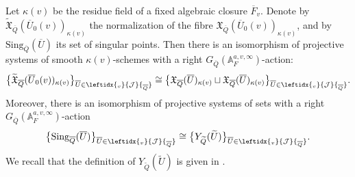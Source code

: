 \documentclass[a4paper, notitlepage, 10pt]{amsart}
\theoremstyle{plain} %
\theoremstyle{definition} %
\theoremstyle{remark} %
\numberwithin{equation}{section}
\begin{document}
 Let $\kappa(v)$ be the residue field of a fixed algebraic closure $\overline{F}_v$. Denote by ${\widetilde{\mathfrak{X}}}_{\overline{Q}}(\overline{U}_0(v))_{\kappa(v)}$ the normalization of the 
 fibre ${\mathfrak{X}}_{\overline{Q}}(\overline{U}_0(v))_{\kappa(v)}$, and by $\text{Sing}_{\overline{Q}}(\overline{U})$ its set of singular points. Then there is an isomorphism of projective systems of smooth $\kappa(v)$-schemes with a right $G_{\overline{Q}}(\mathbb{A}_F^{a,v,\infty})$-action:
\begin{equation}\label{ver(g)}
    \big\{{\widetilde{\mathfrak{X}}}_{\overline{Q}}(\overline{U}_0(v))_{\kappa(v)}\big\}_{\overline{U}\in \leftidx{_v}{\mathcal{J}}{_{\overline{Q}}}} \cong \big\{{\mathfrak{X}}_{\overline{Q}}(\overline{U})_{\kappa(v)} \sqcup {\mathfrak{X}}_{\overline{Q}}(\overline{U})_{\kappa(v)} \big\}_{\overline{U}\in \leftidx{_v}{\mathcal{J}}{_{\overline{Q}}}}.
\end{equation}
Moreover, there is an isomorphism of projective systems of sets with a right $G_{\overline{Q}}(\mathbb{A}_F^{a,v,\infty})$-action
\begin{equation}\label{sspoints}
    \big\{\text{Sing}_{\overline{Q}}(\overline{U})\big\}_{\overline{U}\in \leftidx{_v}{\mathcal{J}}{_{\overline{Q}}}} \cong \big\{Y_{\widetilde{Q}}(\widetilde{U})\big\}_{\overline{U}\in \leftidx{_v}{\mathcal{J}}{_{\overline{Q}}}}.
\end{equation}
We recall that the definition of $Y_{\widetilde{Q}}(\widetilde{U})$ is given in .
\end{document}
